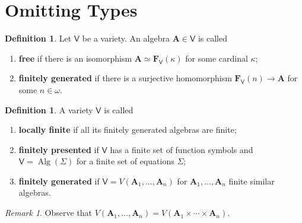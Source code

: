 \documentclass{amsart}
\theoremstyle{plain}
\theoremstyle{definition}
\newtheorem{definition}[theorem]{Definition}
\theoremstyle{remark}
\newtheorem{remark}[theorem]{Remark}
\DeclareMathOperator{\Alg}{Alg}
\begin{document}
\section{Omitting Types}

\begin{definition}
    Let $\mathsf{V}$ be a variety. 
    An algebra $\mathbf{A} \in \mathsf{V}$ is called
    \begin{enumerate}
        \item \textbf{free} if there is an isomorphism $\mathbf{A} \simeq \mathbf{F}_{\mathsf{V}}(\kappa)$ for some cardinal $\kappa$; 
        \item \textbf{finitely generated} if there is a surjective homomorphism $\mathbf{F}_{\mathsf{V}}(n) \to \mathbf{A}$ for some $n \in \omega$. 
    \end{enumerate} 
\end{definition}

\begin{definition}
    A variety $\mathsf{V}$ is called 
    \begin{enumerate}
    \item \textbf{locally finite} if all its finitely generated algebras are finite; 
    \item \textbf{finitely presented} if $\mathsf{V}$ has a finite set of function symbols and $\mathsf{V}= \Alg(\Sigma)$ for a finite set of equations $\Sigma$; 
    \item \textbf{finitely generated} if $\mathsf{V}=V(\mathbf{A}_1, \ldots, \mathbf{A}_n)$ for $\mathbf{A}_1, \ldots, \mathbf{A}_n$ finite similar algebras. 
    \end{enumerate}
\end{definition}

\begin{remark}
    Observe that $V(\mathbf{A}_1, \ldots, \mathbf{A}_n)=V(\mathbf{A}_1 \times \cdots \times \mathbf{A}_n)$.  
\end{remark}
\end{document}
